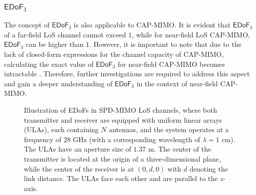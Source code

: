 \documentclass[journal]{IEEEtran}
\theoremstyle{definition}
\begin{document}
\subsubsection{${\mathsf{EDoF}}_3$}
The concept of ${\mathsf{EDoF}}_3$ is also applicable to CAP-MIMO. It is evident that ${\mathsf{EDoF}}_3$ of a far-field LoS channel cannot exceed $1$, while for near-field LoS CAP-MIMO, ${\mathsf{EDoF}}_3$ can be higher than $1$. However, it is important to note that due to the lack of closed-form expressions for the channel capacity of CAP-MIMO, calculating the exact value of ${\mathsf{EDoF}}_3$ for near-field CAP-MIMO becomes intractable \cite{Wan2023}. Therefore, further investigations are required to address this aspect and gain a deeper understanding of ${\mathsf{EDoF}}_3$ in the context of near-field CAP-MIMO.

\begin{figure}[!t]
    \centering
    \subfigbottomskip=0pt
    \setlength{\abovecaptionskip}{0pt}
\caption{Illustration of EDoFs in SPD-MIMO LoS channels, where both transmitter and receiver are equipped with uniform linear arrays (ULAs), each containing $N$ antennas, and the system operates at a frequency of $28$ GHz (with a corresponding wavelength of $\lambda=1$ cm). The ULAs have an aperture size of $1.37$ m. The center of the transmitter is located at the origin of a three-dimensional plane, while the center of the receiver is at $(0,d,0)$ with $d$ denoting the link distance. The ULAs face each other and are parallel to the $z$-axis.}
\label{figure_SPD_EDoF}
\vspace{-10pt}
\end{figure}
\end{document}
